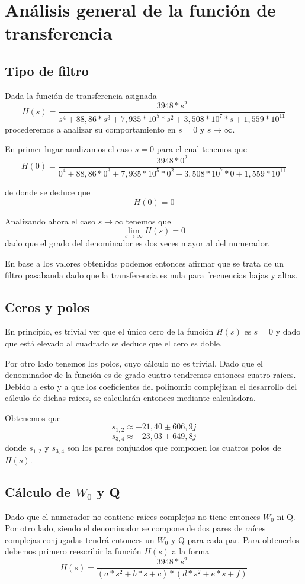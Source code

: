 \documentclass[11pt,a4paper]{report}
\author{Marcos}
\begin{document}

\section*{Análisis general de la función de transferencia}

\subsection*{Tipo de filtro}

Dada la función de transferencia asignada
\[H(s)=\frac{3948*s^2}{s^4+88,86*s^3+7,935*10^5*s^2+3,508*10^7*s+1,559*10^{11}}\]
procederemos a analizar su comportamiento en $s=0$ y $s\longrightarrow\infty$.

\bigskip
En primer lugar analizamos el caso $s=0$ para el cual tenemos que 
\[H(0) = \frac{3948*0^2}{0^4+88,86*0^3+7,935*10^5*0^2+3,508*10^7*0+1,559*10^{11}}\]

de donde se deduce que
\[H(0) = 0\]

Analizando ahora el caso $s\longrightarrow\infty$ tenemos que
\[\lim_{s \to \infty} H(s) = 0\]
dado que el grado del denominador es dos veces mayor al del numerador.

\bigskip
En base a los valores obtenidos podemos entonces afirmar que se trata de un
filtro pasabanda dado que la transferencia es nula para frecuencias bajas y altas.

\subsection*{Ceros y polos}

En principio, es trivial ver que el único cero de la función $H(s)$ es
$s = 0$ y dado que está elevado al cuadrado se deduce que el cero es doble.

\bigskip
Por otro lado tenemos los polos, cuyo cálculo no es trivial. Dado que el denominador de la función es de grado cuatro tendremos entonces cuatro raíces. Debido a esto
y a que los coeficientes del polinomio complejizan el desarrollo del cálculo de 
dichas raíces, se calcularán entonces mediante calculadora. 

\bigskip
Obtenemos que
\[s_{1,2} \approx -21,40 \pm 606,9j\]
\[s_{3,4} \approx -23,03 \pm 649,8j\]
donde $s_{1,2}$ y $s_{3,4}$ son los pares conjuados que componen los cuatros
polos de $H(s)$.

\subsection*{Cálculo de $W_{0}$ y Q}

Dado que el numerador no contiene raíces complejas no tiene entonces 
$W_{0}$ ni Q. Por otro lado, siendo el denominador se compone de dos pares de raíces complejas conjugadas tendrá entonces un $W_{0}$ y Q para cada par. Para obtenerlos debemos primero reescribir la función $H(s)$ a la forma
\[H(s)=\frac{3948*s^2}{(a*s^2+b*s+c)*(d*s^2+e*s+f)}\]
\end{document}
